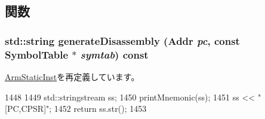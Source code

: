 \subsection{関数}
\hypertarget{classArmISA_1_1MicroSetPCCPSR_a95d323a22a5f07e14d6b4c9385a91896}{
\subsubsection[{generateDisassembly}]{\setlength{\rightskip}{0pt plus 5cm}std::string generateDisassembly ({\bf Addr} {\em pc}, \/  const SymbolTable $\ast$ {\em symtab}) const}}
\label{classArmISA_1_1MicroSetPCCPSR_a95d323a22a5f07e14d6b4c9385a91896}


\hyperlink{classArmISA_1_1ArmStaticInst_a95d323a22a5f07e14d6b4c9385a91896}{ArmStaticInst}を再定義しています。


\begin{DoxyCode}
1448 {
1449     std::stringstream ss;
1450     printMnemonic(ss);
1451     ss << "[PC,CPSR]";
1452     return ss.str();
1453 }
\end{DoxyCode}


